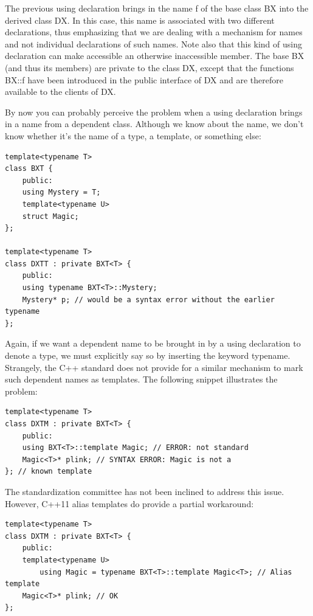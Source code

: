 The previous using declaration brings in the name f of the base class BX into the derived class DX. In this case, this name is associated with two different declarations, thus emphasizing that we are dealing with a mechanism for names and not individual declarations of such names. Note also that this kind of using declaration can make accessible an otherwise inaccessible member. The base BX (and thus its members) are private to the class DX, except that the functions BX::f have been introduced in the public interface of DX and are therefore available to the clients of DX.

By now you can probably perceive the problem when a using declaration brings in a name from a dependent class. Although we know about the name, we don’t know whether it’s the name of a type, a template, or something else:

\begin{lstlisting}[style=styleCXX]
template<typename T>
class BXT {
	public:
	using Mystery = T;
	template<typename U>
	struct Magic;
};

template<typename T>
class DXTT : private BXT<T> {
	public:
	using typename BXT<T>::Mystery;
	Mystery* p; // would be a syntax error without the earlier typename
};
\end{lstlisting}

Again, if we want a dependent name to be brought in by a using declaration to denote a type, we must explicitly say so by inserting the keyword typename. Strangely, the C++ standard does not provide for a similar mechanism to mark such dependent names as templates. The following snippet illustrates the problem:

\begin{lstlisting}[style=styleCXX]
template<typename T>
class DXTM : private BXT<T> {
	public:
	using BXT<T>::template Magic; // ERROR: not standard
	Magic<T>* plink; // SYNTAX ERROR: Magic is not a
}; // known template
\end{lstlisting}

The standardization committee has not been inclined to address this issue. However, C++11 alias templates do provide a partial workaround:

\begin{lstlisting}[style=styleCXX]
template<typename T>
class DXTM : private BXT<T> {
	public:
	template<typename U>
		using Magic = typename BXT<T>::template Magic<T>; // Alias template
	Magic<T>* plink; // OK
};
\end{lstlisting}

